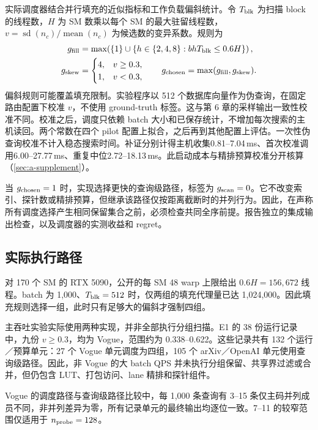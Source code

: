 实际调度器结合并行填充的近似指标和工作负载偏斜统计。令 $T_{\rm blk}$ 为扫描 block 的线程数，$H$ 为 SM 数乘以每个 SM 的最大驻留线程数，$v=\operatorname{sd}(n_c)/\operatorname{mean}(n_c)$ 为候选数的变异系数。规则为
\begin{align}
 g_{\rm fill}
 &=\max\!\left(\{1\}\cup
       \{h\in\{2,4,8\}:bhT_{\rm blk}\leq0.6H\}\right),
       \label{eq:5-fill-rule}\\
 g_{\rm skew}&=
   \begin{cases}4,&v\geq0.3,\\1,&v<0.3,\end{cases}
 \qquad
 g_{\rm chosen}=\max(g_{\rm fill},g_{\rm skew}).
 \label{eq:5-skew-rule}
\end{align}
偏斜规则可能覆盖填充限制。实验程序以 512 个数据库向量作为伪查询，在固定路由配置下校准 $v$，不使用 ground-truth 标签。这与第 6 章的采样输出一致性校准不同。校准之后，调度只依赖 batch 大小和已保存统计，不增加每次搜索的主机读回。两个常数在四个 pilot 配置上拟合，之后再到其他配置上评估。一次性伪查询校准不计入稳态搜索时间。补证分别计得主机收集0.81--7.04\,ms、首次校准调用6.00--27.77\,ms、重复中位2.72--18.13\,ms。此启动成本与精排预算校准分开核算（\cref{sec:a-supplement}）。

当 $g_{\rm chosen}=1$ 时，实现选择更快的查询级路径，标签为 $g_{\mathrm{scan}}=0$。它不改变索引、探针数或精排预算，但继承该路径仅按距离截断时的并列行为。因此，在声称所有调度选择产生相同保留集合之前，必须检查共同全序前提。报告独立的集成输出检查，以及调度器的实测收益和 regret。

\subsection{实际执行路径}

对 170 个 SM 的 RTX 5090，公开的每 SM 48 warp 上限给出 $0.6H=156{,}672$ 线程\cite{blackwell_tuning}。batch 为 1,000、$T_{\rm blk}=512$ 时，仅两组的填充代理量已达 1,024,000。因此填充规则选择一组，此时只有足够大的偏斜才强制四组。

主吞吐实验实际使用两种实现，并非全部执行分组扫描。E1 的 38 份运行记录中，九份 $v\geq0.3$，均为 Vogue，范围约为 0.338--0.622。这些记录共有 132 个运行／预算单元：27 个 Vogue 单元调度为四组，105 个 arXiv／OpenAI 单元使用查询级路径。因此，非 Vogue 的大 batch QPS 并未执行分组保留、共享界过滤或合并，但仍包含 LUT、打包访问、lane 精排和探针组件。

Vogue 的调度路径与查询级路径比较中，每 1,000 条查询有 3--15 条仅主码并列成员不同，非并列差异为零，所有记录单元的最终输出均逐位一致。7--11 的较窄范围仅适用于 $n_{\rm probe}=128$。

